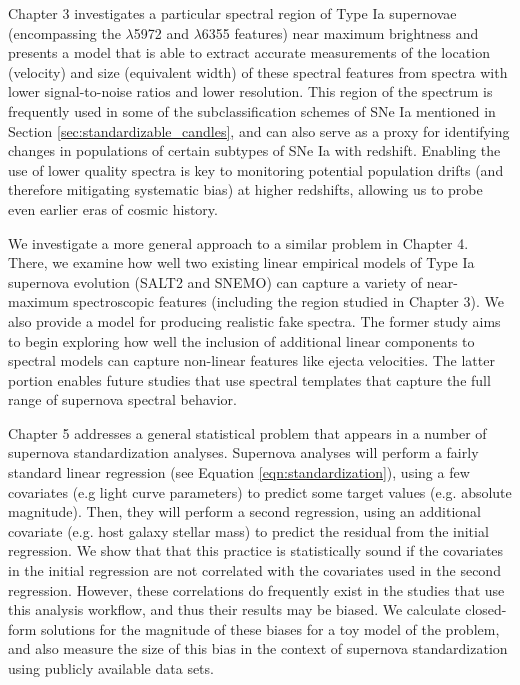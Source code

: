 Chapter 3 investigates a particular spectral region of Type Ia supernovae (encompassing the $\lambda$5972 and $\lambda$6355 features) near maximum brightness and presents a model that is able to extract accurate measurements of the location (velocity) and size (equivalent width) of these spectral features from spectra with lower signal-to-noise ratios and lower resolution. This region of the spectrum is frequently used in some of the subclassification schemes of SNe Ia mentioned in Section \ref{sec:standardizable_candles}, and can also serve as a proxy for identifying changes in populations of certain subtypes of SNe Ia with redshift. Enabling the use of lower quality spectra is key to monitoring potential population drifts (and therefore mitigating systematic bias) at higher redshifts, allowing us to probe even earlier eras of cosmic history.

We investigate a more general approach to a similar problem in Chapter 4. There, we examine how well two existing linear empirical models of Type Ia supernova evolution (SALT2 and SNEMO) can capture a variety of near-maximum spectroscopic features (including the region studied in Chapter 3). We also provide a model for producing realistic fake spectra. The former study aims to begin exploring how well the inclusion of additional linear components to spectral models can capture non-linear features like ejecta velocities. The latter portion enables future studies that use spectral templates that capture the full range of supernova spectral behavior.

Chapter 5 addresses a general statistical problem that appears in a number of supernova standardization analyses. Supernova analyses will perform a fairly standard linear regression (see Equation \ref{eqn:standardization}), using a few covariates (e.g light curve parameters) to predict some target values (e.g. absolute magnitude). Then, they will perform a second regression, using an additional covariate (e.g. host galaxy stellar mass) to predict the residual from the initial regression. We show that that this practice is statistically sound if the covariates in the initial regression are not correlated with the covariates used in the second regression. However, these correlations do frequently exist in the studies that use this analysis workflow, and thus their results may be biased. We calculate closed-form solutions for the magnitude of these biases for a toy model of the problem, and also measure the size of this bias in the context of supernova standardization using publicly available data sets.

